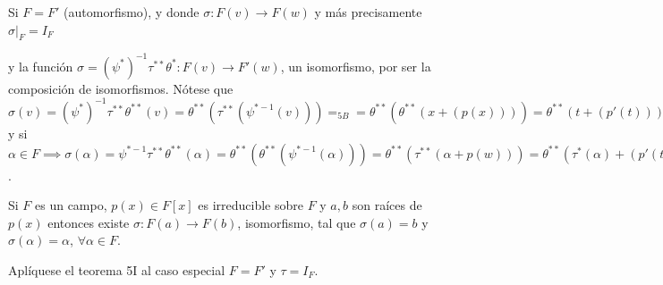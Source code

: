 \begin{teorema}[5I]
\begin{dem}
\begin{figure}[H]
        \end{figure}
    \end{dem}
    \begin{cajita}
        Si $F=F'$ (automorfismo), y donde $\sigma:F(v)\to F(w)$ y más precisamente $\sigma|_F = I_F$
    \end{cajita}
    y la función $\sigma=(\psi^*)^{-1}\tau^{**}\theta^*: F(v)\to F'(w)$, un isomorfismo, por ser la composición de isomorfismos. Nótese que $\sigma(v)=(\psi^{*})^{-1}\tau^{**}\theta^{**}(v)=\theta^{**}(\tau^{**}(\psi^{*-1}(v)))=_{5B}=\theta^{**}(\theta^{**}(x+(p(x))))= \theta^{**}(t+(p'(t)))=w$ y si $\alpha\in F\implies \sigma(\alpha)=\psi^{*-1}\tau^{**}\theta^{**}(\alpha)=\theta^{**}(\theta^{**}(\psi^{*-1}(\alpha)))=\theta^{**}(\tau^{**}(\alpha +p(w)))=\theta^{**}(\tau^{*}(\alpha)+(p'(t)))=_{5.3}=\theta^{**}(\tau(\alpha)+p'(t))=\theta^{**}(\alpha'+(p'(t)))=\alpha'$.
\end{teorema}

\begin{corolario}
    Si $F$ es un campo, $p(x)\in F[x]$ es irreducible sobre $F$ y $a,b$ son raíces de $p(x)$ entonces existe $\sigma: F(a)\to F(b)$, isomorfismo, tal que $\sigma(a)=b$ y $\sigma(\alpha)=\alpha$, $\forall \alpha \in F$.
    \begin{dem}
        Aplíquese el teorema 5I al caso especial $F=F'$ y $\tau =I_F$.
    \end{dem}
\end{corolario}

